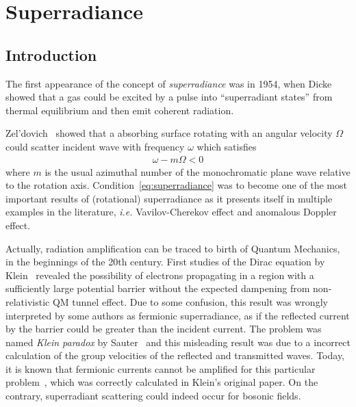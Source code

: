 
\chapter{Superradiance} %
\label{Chapter1} 


\section{Introduction}

The first appearance of the concept of \emph{superradiance} was in 1954, when Dicke~\cite{Dicke1954} showed that a gas could be excited by a pulse into ``superradiant states'' from thermal equilibrium and then emit coherent radiation.

Zel'dovich~\cite{Zeldovich1971,Zeldovich1972} showed that a absorbing surface rotating with an angular velocity $\Omega$ could scatter incident wave with frequency $\omega$ which satisfies
\begin{align}
    \omega - m \Omega < 0
    \label{eq:superradiance}
\end{align}
where $m$ is the usual azimuthal number of the monochromatic plane wave relative to the rotation axis. 
Condition~\eqref{eq:superradiance} was to become one of the most important results of (rotational) superradiance as it presents itself in multiple examples in the literature, \emph{i.e.} Vavilov-Cherekov effect and anomalous Doppler effect.

Actually, radiation amplification can be traced to birth of Quantum Mechanics, in the beginnings of the 20th century. 
First studies of the Dirac equation by Klein~\cite{Klein1929} revealed the possibility of electrons propagating in a region with a sufficiently large potential barrier without the expected dampening from non-relativistic QM tunnel effect.
Due to some confusion, this result was wrongly interpreted by some authors as fermionic superradiance, as if the reflected current by the barrier could be greater than the incident current. 
The problem was named \emph{Klein paradox} by Sauter~\cite{Sauter1931} and this misleading result was due to a incorrect calculation of the group velocities of the reflected and transmitted waves. 
Today, it is known that fermionic currents cannot be amplified for this particular problem~\cite{Manogue1988, Brito2015}, which was correctly calculated in Klein's original paper. 
On the contrary, superradiant scattering could indeed occur for bosonic fields. 



